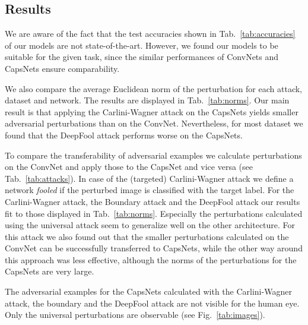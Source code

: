 \documentclass{article}
\begin{document}
\subsection{Results}

We are aware of the fact that the test accuracies shown in Tab.~\ref{tab:accuracies} of our models are not state-of-the-art. However, we found our models to be suitable for the given task, since the similar performances of ConvNets and CapsNets ensure comparability. 
\begin{table}[h]
	\caption{Test accuracies achieved by our networks.}
	\vskip 0.15in
	\centering{}
	\label{tab:accuracies}
\end{table}


We also compare the average Euclidean norm of the perturbation for each attack, dataset and network. The results are displayed in Tab.~\ref{tab:norms}. Our main result is that applying the Carlini-Wagner attack on the CapsNets yields smaller adversarial perturbations than on the ConvNet. Nevertheless, for most dataset we found that the DeepFool attack performs worse on the CapsNets.

To compare the transferability of adversarial examples we calculate
perturbations on the ConvNet and apply those to the CapsNet and vice
versa (see Tab.~\ref{tab:attacks}). In case of the (targeted) Carlini-Wagner attack we define a network \emph{fooled} if the perturbed image is classified with the target label. For the Carlini-Wagner attack, the Boundary attack and the DeepFool attack our results fit to those displayed in Tab.~\ref{tab:norms}. Especially the perturbations calculated using the universal attack seem to generalize well on the other architecture. For this attack we also found out that the smaller perturbations calculated on the ConvNet can be successfully transferred to CapsNets, while the other way around this approach was less effective, although the norms of the perturbations for the CapsNets are very large.

The adversarial examples for the CapsNets calculated with the
Carlini-Wagner attack, the boundary and the DeepFool attack are not
visible for the human eye. Only the universal perturbations are
observable (see Fig.~\ref{tab:images}).
\end{document}
